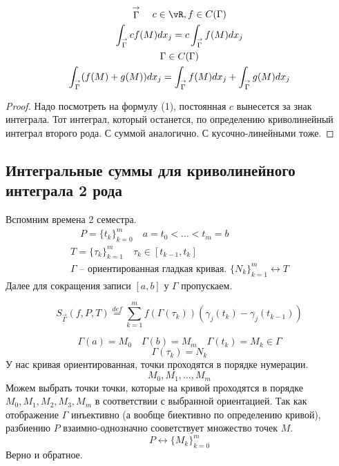 \documentclass[main]{subfiles}
\begin{document}
\begin{theorem}
    \begin{gather*}
        \stackrel{\rightarrow}{\Gamma} \quad c \in \vR, f \in C(\Gamma) \\
        \int_{\stackrel{\rightarrow}{\Gamma}} cf(M)dx_j = c \int_{\stackrel{\rightarrow}{\Gamma}} f(M) dx_j\\
        \Gamma \in C(\Gamma) \\
        \int_{\stackrel{\rightarrow}{\Gamma}} (f(M) + g(M)) dx_j = \int_{\stackrel{\rightarrow}{\Gamma}} f(M) dx_j +
        \int_{\stackrel{\rightarrow}{\Gamma}} g(M)dx_j \\
    \end{gather*}
\end{theorem}
\begin{proof}
    Надо посмотреть на формулу (1), постоянная $c$ вынесется за знак интеграла. Тот интеграл, который останется, по определению криволинейный интеграл второго рода.
    С суммой аналогично. С кусочно-линейными тоже.
\end{proof}

\subsection{Интегральные суммы для криволинейного интеграла 2 рода}
Вспомним времена 2 семестра.
\begin{gather*}
    [a,b] \quad P = \{ t_k \}^m_{k=0} \quad a = t_0 < \ldots < t_m = b \\
    T = \{ \tau_k \}^m_{k=1} \quad \tau_k \in [t_{k-1},t_k] \\
    \Gamma \text{ -- ориентированная гладкая кривая. }
    \{ N_k \}^m_{k=1} \leftrightarrow T
\end{gather*}
Далее для сокращения записи $[a,b]$ у $\Gamma$ пропускаем.
\begin{definition}
    \[S_{\stackrel{\rightarrow}{\Gamma}} (f,P,T) \stackrel{def}{=} \sum^m_{k=1}f(\Gamma(\tau_k))(\gamma_j(t_k)-\gamma_j(t_{k-1})) \tag{3}\]
\end{definition}
\begin{remark}
    \[\Gamma(a) = M_0 \quad \Gamma(b) = M_m \quad \Gamma(t_k) = M_k \in \Gamma \]
    \[\Gamma(\tau_k) = N_k \]
    У нас кривая ориентированная, точки проходятся в порядке нумерации.
    \[ M_0, M_1, \ldots, M_m \]
    Можем выбрать точки точки, которые на кривой проходятся в порядке $M_0, M_1, M_2, M_3, M_m$ в соответствии с выбранной ориентацией.
    Так как отображение $\Gamma$ инъективно (а вообще биективно по определению кривой), разбиению $P$ взаимно-однозначно сооветствует множество точек $M$.
    \[ P \leftrightarrow \{ M_k \}^m_{k=0}  \] Верно и обратное.
\end{remark}
\end{document}
